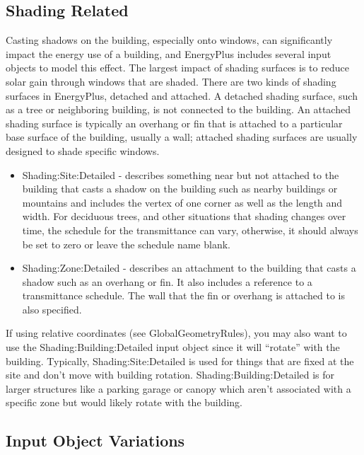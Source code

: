 \subsection*{Shading Related}

Casting shadows on the building, especially onto windows, can significantly
impact the energy use of a building, and EnergyPlus includes several
input objects to model this effect. The largest impact of shading
surfaces is to reduce solar gain through windows that are shaded.
There are two kinds of shading surfaces in EnergyPlus, detached and
attached. A detached shading surface, such as a tree or neighboring
building, is not connected to the building. An attached shading surface
is typically an overhang or fin that is attached to a particular base
surface of the building, usually a wall; attached shading surfaces
are usually designed to shade specific windows.
\begin{itemize}
\item Shading:Site:Detailed - describes something near but not attached
to the building that casts a shadow on the building such as nearby
buildings or mountains and includes the vertex of one corner as well
as the length and width. For deciduous trees, and other situations
that shading changes over time, the schedule for the transmittance
can vary, otherwise, it should always be set to zero or leave the
schedule name blank. 
\item Shading:Zone:Detailed - describes an attachment to the building that
casts a shadow such as an overhang or fin. It also includes a reference
to a transmittance schedule. The wall that the fin or overhang is
attached to is also specified.
\end{itemize}
If using relative coordinates (see GlobalGeometryRules), you may also
want to use the Shading:Building:Detailed input object since it will
``rotate'' with the building. Typically, Shading:Site:Detailed is
used for things that are fixed at the site and don't move with building
rotation. Shading:Building:Detailed is for larger structures like
a parking garage or canopy which aren't associated with a specific
zone but would likely rotate with the building.

\subsection*{Input Object Variations}


